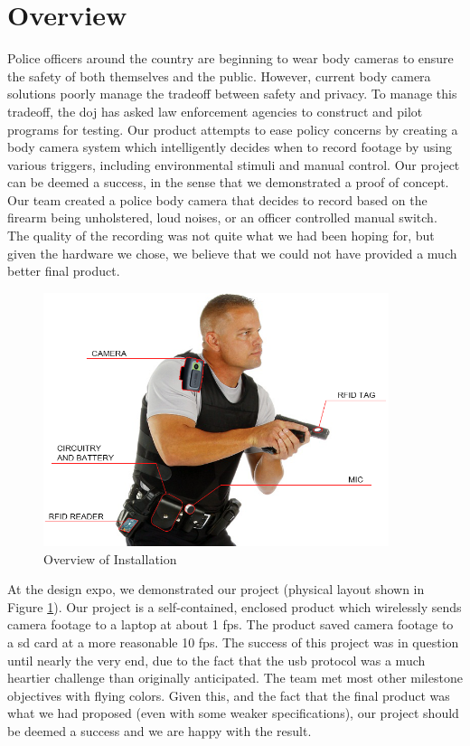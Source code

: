 \documentclass[12pt]{article}
\begin{document}
\section{Overview}
Police officers around the country are beginning to wear body cameras to ensure
the safety of both themselves and the public. However, current body camera
solutions poorly manage the tradeoff between safety and privacy. To manage this
tradeoff, the \gls{doj} has asked law enforcement agencies to construct and
pilot programs for testing\cite{officer_privacy}.  Our product attempts to ease
policy concerns by creating a body camera system which intelligently decides
when to record footage by using various triggers, including environmental
stimuli and manual control.  Our project can be deemed a success, in the sense
that we demonstrated a proof of concept. Our team created a police body camera
that decides to record based on the firearm being unholstered, loud noises, or
an officer controlled manual switch.  The quality of the recording was not
quite what we had been hoping for, but given the hardware we chose, we believe
that we could not have provided a much better final product. 

\begin{figure}[h]
    \centering
    \includegraphics[width=0.9\textwidth]{installation}
    \caption{Overview of Installation}
    \label{fig:installation}
\end{figure}

At the design expo, we demonstrated our project (physical layout shown in Figure
\ref{fig:installation}).  Our project is a self-contained, enclosed product
which wirelessly sends camera footage to a laptop at about 1 \gls{fps}. The
product saved camera footage to a \gls{sd} card at a more reasonable 10
\gls{fps}.  The success of this project was in question until nearly the very
end, due to the fact that the \gls{usb} protocol was a much heartier challenge
than originally anticipated. The team met most other milestone objectives with
flying colors. Given this, and the fact that the final product was what we had
proposed (even with some weaker specifications), our project should be deemed a
success and we are happy with the result.
\end{document}
